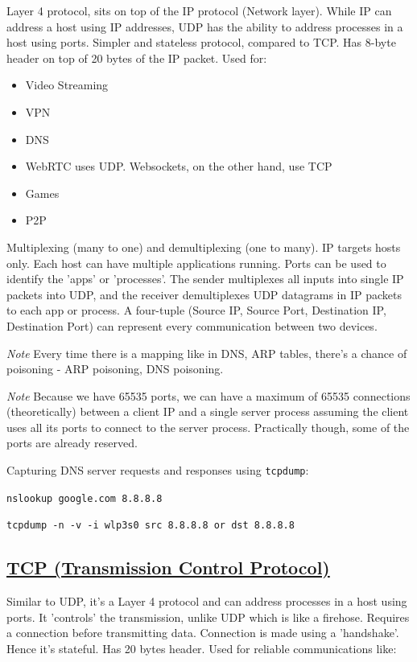 \documentclass{article}
\begin{document}
Layer 4 protocol, sits on top of the IP protocol (Network layer). While IP can address a host using IP addresses, UDP has the ability to address processes in a host using ports. Simpler and stateless protocol, compared to TCP. Has 8-byte header on top of 20 bytes of the IP packet. Used for:

\begin{itemize}
    \item Video Streaming
    \item VPN
    \item DNS
    \item WebRTC uses UDP. Websockets, on the other hand, use TCP
    \item Games
    \item P2P
\end{itemize}

Multiplexing (many to one) and demultiplexing (one to many). IP targets hosts only. Each host can have multiple applications running. Ports can be used to identify the 'apps' or 'processes'. The sender multiplexes all inputs into single IP packets into UDP, and the receiver demultiplexes UDP datagrams in IP packets to each app or process. A four-tuple (Source IP, Source Port, Destination IP, Destination Port) can represent every communication between two devices.

\textit{Note} Every time there is a mapping like in DNS, ARP tables, there's a chance of poisoning - ARP poisoning, DNS poisoning.

\textit{Note} Because we have 65535 ports, we can have a maximum of 65535 connections (theoretically) between a client IP and a single server process assuming the client uses all its ports to connect to the server process. Practically though, some of the ports are already reserved.

Capturing DNS server requests and responses using \texttt{tcpdump}:

\texttt{nslookup google.com 8.8.8.8}

\texttt{tcpdump -n -v -i wlp3s0 src 8.8.8.8 or dst 8.8.8.8}

\subsection*{\href{https://en.wikipedia.org/wiki/Transmission_Control_Protocol}{TCP (Transmission Control Protocol)}}

Similar to UDP, it's a Layer 4 protocol and can address processes in a host using ports. It 'controls' the transmission, unlike UDP which is like a firehose. Requires a connection before transmitting data. Connection is made using a 'handshake'. Hence it's stateful. Has 20 bytes header. Used for reliable communications like:
\end{document}
